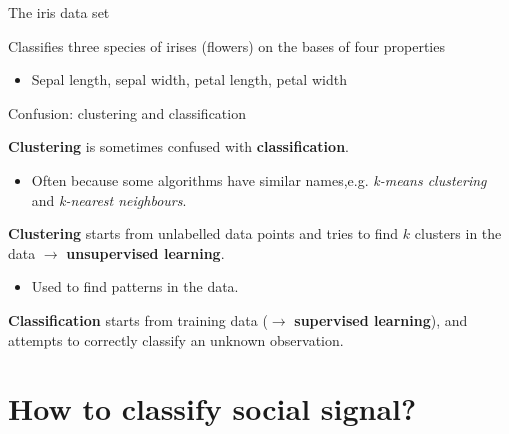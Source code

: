 \documentclass[compress]{beamer}
\begin{document}
\begin{frame}{The iris data set}

Classifies three species of irises (flowers) on the bases of four
properties

\begin{itemize}

\item Sepal length, sepal width, petal length, petal width
\end{itemize}

\end{frame}

\begin{frame}{Confusion: clustering and classification}

\textbf{Clustering} is sometimes confused with \textbf{classification}.

\begin{itemize}

\item Often because some algorithms have similar names,e.g. \emph{k-means
  clustering} and \emph{k-nearest neighbours}.
\end{itemize}

\textbf{Clustering} starts from unlabelled data points and tries to find
    $k$ clusters in the data $\rightarrow$ \textbf{unsupervised learning}.

\begin{itemize}

\item Used to find patterns in the data.
\end{itemize}

    \textbf{Classification} starts from training data ($\rightarrow$
    \textbf{supervised learning}), and attempts to correctly classify an
    unknown observation.

\end{frame}


\section[Classifying social signal]{How to classify social signal?}
\end{document}
